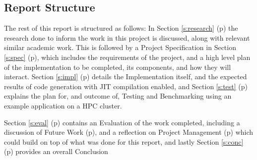 \clearpage
\subsection{Report Structure}
The rest of this report is structured as follows: In Section \ref{s:research} (p\pageref{s:research}) the research done to inform the work in this project is discussed, along with relevant similar academic work. This is followed by a Project Specification in Section \ref{s:spec} (p\pageref{s:spec}), which includes the requirements of the project, and a high level plan of the implementation to be completed, its components, and how they will interact.
Section \ref{s:impl} (p\pageref{s:impl}) details the Implementation itself, and the expected results of code generation with JIT compilation enabled, and Section \ref{s:test} (p\pageref{s:test}) explains the plan for, and outcome of, Testing and Benchmarking using an example application on a HPC cluster.
\par Section \ref{s:eval} (p\pageref{s:eval}) contains an Evaluation of the work completed, including a discussion of Future Work (p\pageref{ss:fw}), and a reflection on Project Management (p\pageref{ss:pm}) which could build on top of what was done for this report, and lastly Section \ref{s:conc} (p\pageref{s:conc}) provides an overall Conclusion
